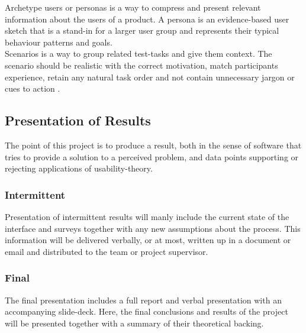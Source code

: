 \documentclass[10pt]{article}
\begin{document}
      Archetype users or personas is a way to compress and present relevant
      information about the users of a product. A persona is an evidence-based
      user sketch that is a stand-in for a larger user group and represents
      their typical behaviour patterns and
      goals\cite[p.331]{c_handbook_usability}. \\

      Scenarios is a way to group related test-tasks and give them context. The
      scenario should be realistic with the correct motivation, match
      participants experience, retain any natural task order and not contain
      unnecessary jargon or cues to action \cite[p.182]{c_handbook_usability}.

  \subsection{Presentation of Results}

    The point of this project is to produce a result, both in the sense of
    software that tries to provide a solution to a perceived problem, and data
    points supporting or rejecting applications of usability-theory.

    \subsubsection{Intermittent}

      Presentation of intermittent results will manly include the current state
      of the interface and surveys together with any new assumptions about the
      process. This information will be delivered verbally, or at most, written
      up in a document or email and distributed to the team or project
      supervisor.

    \subsubsection{Final}

      The final presentation includes a full report and verbal presentation
      with an accompanying slide-deck. Here, the final conclusions and results
      of the project will be presented together with a summary of their
      theoretical backing.

%
%
%
%
%
%
\end{document}
